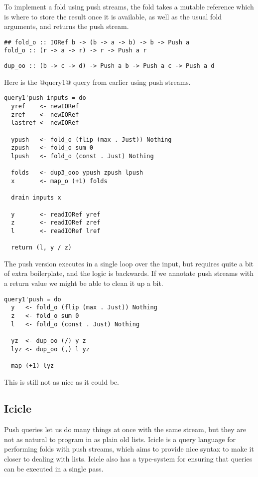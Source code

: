 To implement a fold using push streams, the fold takes a mutable reference which is where to store the result once it is available, as well as the usual fold arguments, and returns the push stream.

\begin{lstlisting}
## fold_o :: IORef b -> (b -> a -> b) -> b -> Push a
fold_o :: (r -> a -> r) -> r -> Push a r
\end{lstlisting}

\begin{lstlisting}
dup_oo :: (b -> c -> d) -> Push a b -> Push a c -> Push a d
\end{lstlisting}

Here is the @query1@ query from earlier using push streams.

\begin{lstlisting}
query1'push inputs = do
  yref    <- newIORef
  zref    <- newIORef
  lastref <- newIORef

  ypush   <- fold_o (flip (max . Just)) Nothing
  zpush   <- fold_o sum 0
  lpush   <- fold_o (const . Just) Nothing

  folds   <- dup3_ooo ypush zpush lpush
  x       <- map_o (+1) folds

  drain inputs x

  y       <- readIORef yref
  z       <- readIORef zref
  l       <- readIORef lref

  return (l, y / z)
\end{lstlisting}

The push version executes in a single loop over the input, but requires quite a bit of extra boilerplate, and the logic is backwards.
If we annotate push streams with a return value we might be able to clean it up a bit.

\begin{lstlisting}
query1'push = do
  y   <- fold_o (flip (max . Just)) Nothing
  z   <- fold_o sum 0
  l   <- fold_o (const . Just) Nothing

  yz  <- dup_oo (/) y z
  lyz <- dup_oo (,) l yz

  map (+1) lyz
\end{lstlisting}


This is still not as nice as it could be.

\subsection{Icicle}

Push queries let us do many things at once with the same stream, but they are not as natural to program in as plain old lists.
Icicle is a query language for performing folds with push streams, which aims to provide nice syntax to make it closer to dealing with lists.
Icicle also has a type-system for ensuring that queries can be executed in a single pass.

